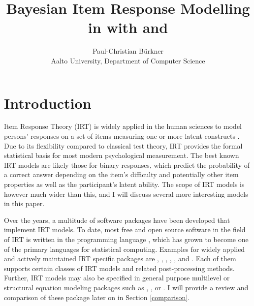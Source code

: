 \documentclass[jss]{jss}
\author{
Paul-Christian Bürkner\\Aalto University, Department of Computer Science
}
\title{Bayesian Item Response Modelling in \proglang{R} with \pkg{brms} and
\proglang{Stan}}
\begin{document}
\hypertarget{introduction}{%
\section{Introduction}\label{introduction}}

Item Response Theory (IRT) is widely applied in the human sciences to
model persons' responses on a set of items measuring one or more latent
constructs \citep[for a comprehensive introduction
see][]{lord2012, embretson2013, vanderlinden2013}. Due to its
flexibility compared to classical test theory, IRT provides the formal
statistical basis for most modern psychological measurement. The best
known IRT models are likely those for binary responses, which predict
the probability of a correct answer depending on the item's difficulty
and potentially other item properties as well as the participant's
latent ability. The scope of IRT models is however much wider than this,
and I will discuss several more interesting models in this paper.

Over the years, a multitude of software packages have been developed
that implement IRT models. To date, most free and open source software
in the field of IRT is written in the programming language 
\citep{R}, which has grown to become one of the primary languages for
statistical computing. Examples for widely applied and actively
maintained IRT specific  packages are  \citep{eRm},
 \citep{ltm},  \citep{TAM},  \citep{mirt},
 \citep{sirt}, and 
\citep{psychotree1, psychotree2}. Each of them supports certain classes
of IRT models and related post-processing methods. Further, IRT models
may also be specified in general purpose multilevel or structural
equation modeling packages such as  \citep{lme4}, 
\citep{lavaan}, or  \citep{blavaan}. I will provide a
review and comparison of these package later on in Section
\ref{comparison}.
\end{document}
